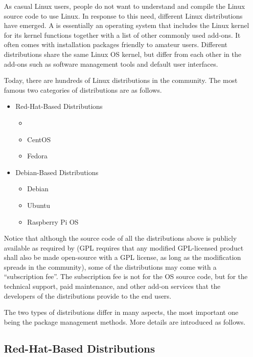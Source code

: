 As casual Linux users, people do not want to understand and compile the Linux source code to use Linux. In response to this need, different Linux distributions have emerged. A  is essentially an operating system that includes the Linux kernel for its kernel functions together with a list of other commonly used add-ons. It often comes with installation packages friendly to amateur users. Different distributions share the same Linux OS kernel, but differ from each other in the add-ons such as software management tools and default user interfaces.

Today, there are hundreds of Linux distributions in the community. The most famous two categories of distributions are as follows.
\begin{itemize}
  \item Red-Hat-Based Distributions
  \begin{itemize}
    \item {}
    \item CentOS
    \item Fedora
  \end{itemize}
  \item Debian-Based Distributions
  \begin{itemize}
    \item Debian
    \item Ubuntu
    \item Raspberry Pi OS
  \end{itemize}
\end{itemize}

Notice that although the source code of all the distributions above is publicly available as required by  (GPL requires that any modified GPL-licensed product shall also be made open-source with a GPL license, as long as the modification spreads in the community), some of the distributions may come with a ``subscription fee''. The subscription fee is not for the OS source code, but for the technical support, paid maintenance, and other add-on services that the developers of the distributions provide to the end users.

The two types of distributions differ in many aspects, the most important one being the package management methods. More details are introduced as follows.

\subsection{Red-Hat-Based Distributions}

